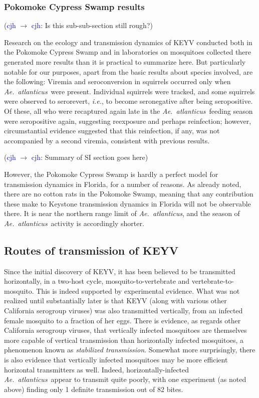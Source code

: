 \documentclass[12pt]{article}
\newcommand{\atl}{\textit{Ae.\ atlanticus}}
\newcommand{\ie}{\textit{i.e.}}
\newcommand{\cjh}{\textcolor{blue}{cjh}}
\newcommand{\msg}[3]{(#1 $\rightarrow$ #2: #3)}
\newcommand{\mcc}[1]{\msg\cjh\cjh{#1}}
\begin{document}
            \subsubsection{Pokomoke Cypress Swamp results}
                \label{pokomoke-results}
                \mcc{Is this sub-sub-section still rough?}

                Research on the ecology and transmission dynamics of KEYV conducted both in the Pokomoke Cypress Swamp and in laboratories on mosquitoes collected there generated more results than it is practical to summarize here. But particularly notable for our purposes, apart from the basic results about species involved, are the following: Viremia and seroconversion in squirrels occurred only when \atl\ were present.\cite{watts1988maintenance} Individual squirrels were tracked, and some squirrels were observed to serorevert, \ie, to become seronegative after being seropositive. Of these, all who were recaptured again late in the \atl\ feeding season were seropositive again, suggesting reexposure and perhaps reinfection; however, circumstantial evidence suggested that this reinfection, if any, was not accompanied by a second viremia\cite{watts1988maintenance}, consistent with previous results\cite{watts1979experimental}.
                
                \mcc{Summary of SI section goes here}

                However, the Pokomoke Cypress Swamp is hardly a perfect model for transmission dynamics in Florida, for a number of reasons. As already noted, there are no cotton rats in the Pokomoke Swamp, meaning that any contribution these make to Keystone transmission dynamics in Florida will not be observable there. It is near the northern range limit of \atl, and the season of \atl\ activity is accordingly shorter.

        \subsection{Routes of transmission of KEYV}
            \label{transmission-routes}
            Since the initial discovery of KEYV, it has been believed to be transmitted horizontally, in a two-host cycle, mosquito-to-vertebrate and vertebrate-to-mosquito. This is indeed supported by experimental evidence. What was not realized until substantially later is that KEYV (along with various other California serogroup viruses) was also transmitted vertically, from an infected female mosquito to a fraction of her eggs. There is evidence, as regards other California serogroup viruses, that vertically infected mosquitoes are themselves more capable of vertical transmission than horizontally infected mosquitoes, a phenomenon known as \textit{stabilized transmission}. Somewhat more surprisingly, there is also evidence that vertically infected mosquitoes may be more efficient horizontal transmitters as well. Indeed, horizontally-infected \atl\ appear to transmit quite poorly, with one experiment (as noted above) finding only 1 definite transmission out of 82 bites.\cite{watts1988maintenance}
\end{document}
